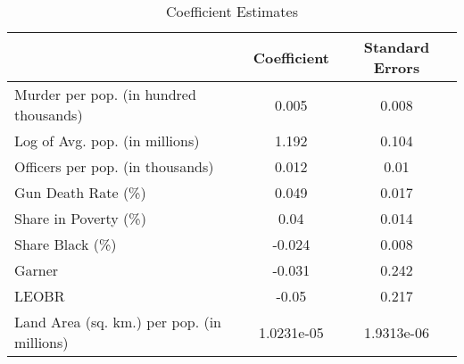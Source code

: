 \begin{table}[ht]
\centering
\caption{Coefficient Estimates} \label{table:coefficients}
\begin{tabular}{lcc}
\hline \hline
& Coefficient & Standard Errors \\ 
\hline
Murder per pop. (in hundred thousands) &0.005&0.008\\
Log of Avg. pop. (in millions) &1.192&0.104\\
Officers per pop. (in thousands) &0.012&0.01\\
Gun Death Rate (\%) &0.049&0.017\\
Share in Poverty (\%) &0.04&0.014\\
Share Black (\%) &-0.024&0.008\\
Garner &-0.031&0.242\\
LEOBR &-0.05&0.217\\
Land Area (sq. km.) per pop. (in millions) &1.0231e-05&1.9313e-06\\
\hline \end{tabular} \end{table}
